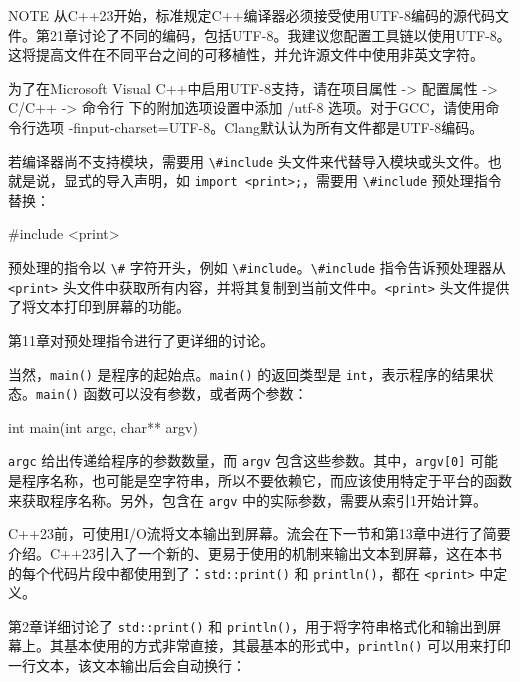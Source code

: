\begin{myNotic}{NOTE}
从C++23开始，标准规定C++编译器必须接受使用UTF-8编码的源代码文件。第21章讨论了不同的编码，包括UTF-8。我建议您配置工具链以使用UTF-8。这将提高文件在不同平台之间的可移植性，并允许源文件中使用非英文字符。

为了在Microsoft Visual C++中启用UTF-8支持，请在项目属性 -> 配置属性 -> C/C++ -> 命令行 下的附加选项设置中添加 /utf-8 选项。对于GCC，请使用命令行选项 -finput-charset=UTF-8。Clang默认认为所有文件都是UTF-8编码。
\end{myNotic}


若编译器尚不支持模块，需要用 \verb|\#include| 头文件来代替导入模块或头文件。也就是说，显式的导入声明，如 \verb|import <print>;|，需要用 \verb|\#include| 预处理指令替换：

\begin{cpp}
#include <print>
\end{cpp}

预处理的指令以 \verb|\#| 字符开头，例如 \verb|\#include|。\verb|\#include| 指令告诉预处理器从 \verb|<print>| 头文件中获取所有内容，并将其复制到当前文件中。\verb|<print>| 头文件提供了将文本打印到屏幕的功能。

第11章对预处理指令进行了更详细的讨论。


当然，\verb|main()| 是程序的起始点。\verb|main()| 的返回类型是 \verb|int|，表示程序的结果状态。\verb|main()| 函数可以没有参数，或者两个参数：

\begin{cpp}
int main(int argc, char** argv)
\end{cpp}

\verb|argc| 给出传递给程序的参数数量，而 \verb|argv| 包含这些参数。其中，\verb|argv[0]| 可能是程序名称，也可能是空字符串，所以不要依赖它，而应该使用特定于平台的函数来获取程序名称。另外，包含在 \verb|argv| 中的实际参数，需要从索引1开始计算。



C++23前，可使用I/O流将文本输出到屏幕。流会在下一节和第13章中进行了简要介绍。C++23引入了一个新的、更易于使用的机制来输出文本到屏幕，这在本书的每个代码片段中都使用到了：\verb|std::print()| 和 \verb|println()|，都在 \verb|<print>| 中定义。

第2章详细讨论了 \verb|std::print()| 和 \verb|println()|，用于将字符串格式化和输出到屏幕上。其基本使用的方式非常直接，其最基本的形式中，\verb|println()| 可以用来打印一行文本，该文本输出后会自动换行：

